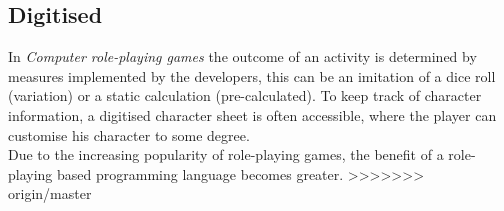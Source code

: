 \subsection{Digitised}
In \emph{Computer role-playing games} the outcome of an activity is determined by measures implemented by the developers, this can be an imitation of a dice roll (variation) or a static calculation (pre-calculated).
To keep track of character information, a digitised character sheet is often accessible, where the player can customise his character to some degree.\\
Due to the increasing popularity of role-playing games, the benefit of a role-playing based programming language becomes greater.
>>>>>>> origin/master
\pagebreak

